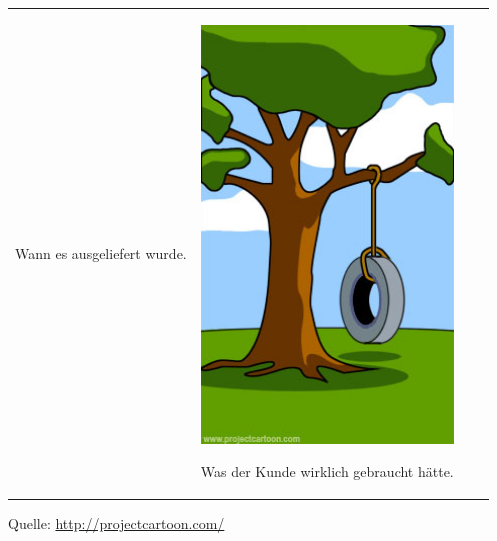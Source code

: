 \begin{tabularx}{\textwidth}{XXXX}
\begin{minipage}[t]{0.23\textwidth}
\begin{center}
Wann es ausgeliefert wurde.
\end{center}
\end{minipage}
& 
\begin{minipage}[t]{0.23\textwidth}
\begin{center}
\includegraphics[width=1.0\textwidth]{./inf/SEKII/29_Softwaretechnik/PM_12.jpg}

Was der Kunde wirklich gebraucht hätte.
\end{center}
\end{minipage}
\\
\end{tabularx}
\egroup

\vspace{5mm}

Quelle: \url{http://projectcartoon.com/}